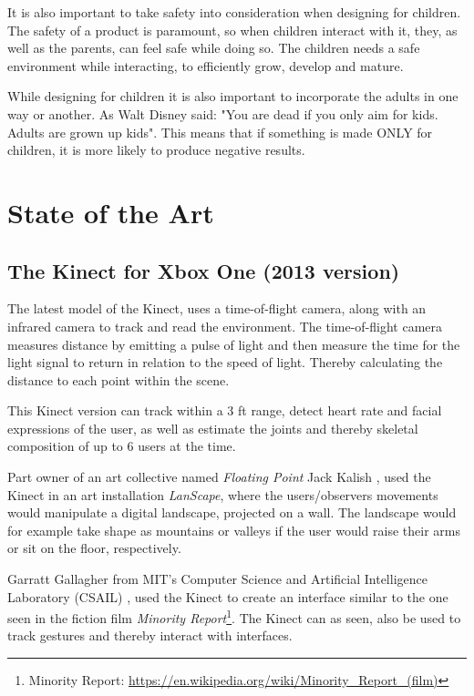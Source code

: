 It is also important to take safety into consideration when designing for children. The safety of a product is paramount, so when children interact with it, they, as well as the parents, can feel safe while doing so. The children needs a safe environment while interacting, to efficiently grow, develop and mature\cite{safetyKids}.

While designing for children it is also important to incorporate the adults in one way or another. As Walt Disney said: "You are dead if you only aim for kids. Adults are grown up kids"\cite{safetyKids}. This means that if something is made ONLY for children, it is more likely to produce negative results.

\section{State of the Art}

    \subsection{The Kinect for Xbox One (2013 version)}
        The latest model of the Kinect, uses a time-of-flight camera, along with an infrared camera to track and read the environment\cite{KinectWiki}. The time-of-flight camera measures distance by emitting a pulse of light and then measure the time for the light signal to return in relation to the speed of light. Thereby calculating the distance to each point within the scene.
        
        This Kinect version can track within a 3 ft range, detect heart rate and facial expressions of the user, as well as estimate the joints and thereby skeletal composition of up to 6 users at the time\cite{KinectWiki}.
        
        Part owner of an art collective named \textit{Floating Point} Jack Kalish \cite{LANscapes}, used the Kinect in an art installation \textit{LanScape}, where the users/observers movements would manipulate a digital landscape, projected on a wall. The landscape would for example take shape as mountains or valleys if the user would raise their arms or sit on the floor, respectively.
        
        Garratt Gallagher from MIT’s Computer Science and Artificial Intelligence Laboratory (CSAIL) \cite{MR_MIT}, used the Kinect to create an interface similar to the one seen in the fiction film \textit{Minority Report}\footnote{Minority Report: \url{https://en.wikipedia.org/wiki/Minority_Report_(film)}}. The Kinect can as seen, also be used to track gestures and thereby interact with interfaces. 

